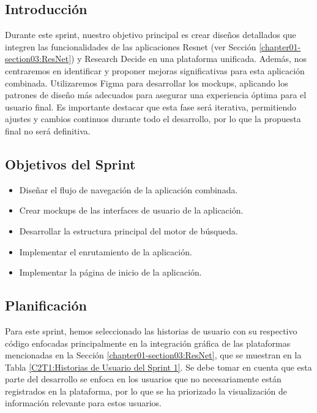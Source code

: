 \subsection{Introducción}
Durante este sprint, nuestro objetivo principal es crear diseños detallados que integren las funcionalidades de las aplicaciones Resnet (ver Sección \ref{chapter01-section03:ResNet}) y Research Decide en una plataforma unificada. Además, nos centraremos en identificar y proponer mejoras significativas para esta aplicación combinada. Utilizaremos Figma para desarrollar los mockups, aplicando los patrones de diseño más adecuados para asegurar una experiencia óptima para el usuario final. Es importante destacar que esta fase será iterativa, permitiendo ajustes y cambios continuos durante todo el desarrollo, por lo que la propuesta final no será definitiva.
\subsection{Objetivos del Sprint}

\begin{itemize}
    \item Diseñar el flujo de navegación de la aplicación combinada.
    \item Crear mockups de las interfaces de usuario de la aplicación.
    \item Desarrollar la estructura  principal del motor de búsqueda.
    \item Implementar el enrutamiento de la aplicación.
    \item Implementar la página de inicio de la aplicación.
\end{itemize}
\subsection{Planificación}
Para este sprint, hemos seleccionado las historias de usuario con su respectivo código enfocadas principalmente en la integración gráfica de las plataformas mencionadas en la Sección \ref{chapter01-section03:ResNet}, que se muestran en la Tabla \ref{C2T1:Historias de Usuario del Sprint 1}. 
Se debe tomar en cuenta que esta parte del desarrollo se enfoca en los usuarios que no necesariamente están registrados en la plataforma, por lo que se ha priorizado la visualización de información relevante para estos usuarios.


